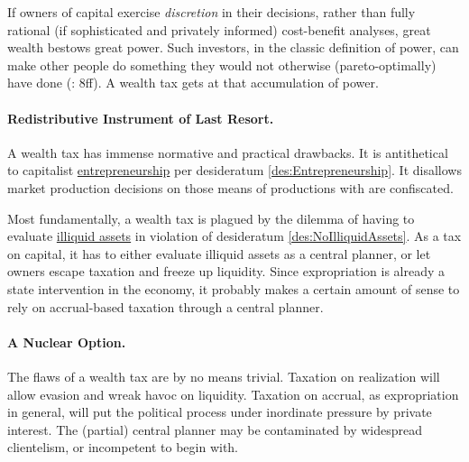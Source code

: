 If owners of capital exercise \emph{discretion} in their decisions, rather than fully rational (if sophisticated and privately informed) cost-benefit analyses, great wealth bestows great power. Such investors, in the classic definition of power, can make other people do something they would not otherwise (pareto-optimally) have done (\citealt{Geoff2002}: 8ff). A wealth tax gets at that accumulation of power.

\paragraph{Redistributive Instrument of Last Resort.} A wealth tax has immense normative and practical drawbacks. It is antithetical to capitalist \hyperref[des:Entrepreneurship]{entrepreneurship} per desideratum \ref{des:Entrepreneurship}. It disallows market production decisions on those means of productions with are confiscated. 

Most fundamentally, a wealth tax is plagued by the dilemma of having to evaluate \hyperref[des:NoIlliquidAssets]{illiquid assets} in violation of desideratum \ref{des:NoIlliquidAssets}. As a tax on capital, it has to either evaluate illiquid assets as a central planner, or let owners escape taxation and freeze up liquidity. Since expropriation is already a state intervention in the economy, it probably makes a certain amount of sense to rely on accrual-based taxation through a central planner.

\paragraph{A Nuclear Option.} The flaws of a wealth tax are by no means trivial. Taxation on realization will allow evasion and wreak havoc on liquidity. Taxation on accrual, as expropriation in general, will put the political process under inordinate pressure by private interest. The (partial) central planner may be contaminated by widespread clientelism, or incompetent to begin with.

